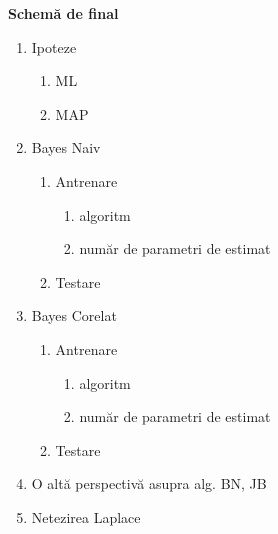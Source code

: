 \documentclass[12pt]{article}
\begin{document}
	\newpage
	\textbf{\large{Schemă de final}}
	\begin{enumerate}
		\item Ipoteze \begin{enumerate}
			\item ML
			\item MAP
		\end{enumerate}
		\item Bayes Naiv
		\begin{enumerate}
			\item Antrenare
			\begin{enumerate}
				\item algoritm
				\item număr de parametri de estimat 
			\end{enumerate}
			\item Testare
		\end{enumerate}
		\item Bayes Corelat
		\begin{enumerate}
			\item Antrenare
			\begin{enumerate}
				\item algoritm
				\item număr de parametri de estimat 
			\end{enumerate}
			\item Testare
		\end{enumerate}
		\item O altă perspectivă asupra alg. BN, JB
		\item Netezirea Laplace
		
	\end{enumerate}
	
\end{document}
